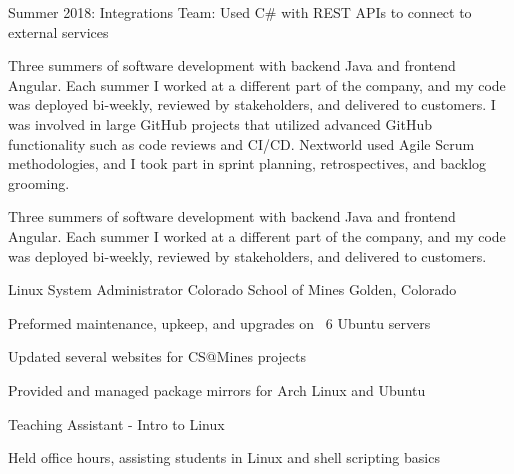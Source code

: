 \begin{cventries}
{\begin{cvitems}
    \item {Summer 2018: Integrations Team: Used C\# with REST APIs to connect to external services }
    \fi
      \end{cvitems}
    }
    {
      \ifcv
      \begin{cventrysummary}
        Three summers of software development with backend Java and frontend Angular.
        Each summer I worked at a different part of the company, and my code was deployed bi-weekly, reviewed by stakeholders, and delivered to customers.
        I was involved in large GitHub projects that utilized advanced GitHub functionality such as code reviews and CI/CD.
        Nextworld used Agile Scrum methodologies, and I took part in sprint planning, retrospectives, and backlog grooming.
      \end{cventrysummary}
      \else
      \begin{cventrysummary}
        Three summers of software development with backend Java and frontend Angular.
        Each summer I worked at a different part of the company, and my code was deployed bi-weekly, reviewed by stakeholders, and delivered to customers.
      \end{cventrysummary}
      \fi
    }

    \cventry
    {Linux System Administrator}
    {Colorado School of Mines}
    {Golden, Colorado}
    {}
    {
        \begin{cvitems}
        \item Preformed maintenance, upkeep, and upgrades on ~6 Ubuntu servers
        \item Updated several websites for CS@Mines projects
        \item Provided and managed package mirrors for Arch Linux and Ubuntu
        \end{cvitems}
    }
    {}

    \vspace{-1.0mm}
    \cventry
    {Teaching Assistant - Intro to Linux}
    {}
    {}
    {}
    {
        \begin{cvitems}
        \item Held office hours, assisting students in Linux and shell scripting basics
        \end{cvitems}
    }
    {}



\end{cventries}
